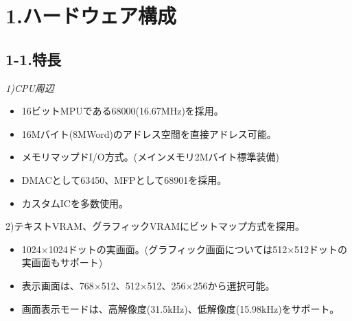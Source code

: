 \documentclass[twoside,a4paper,12pt]{article}
\begin{document}

\newpage

\cfoot{\ \\[-15mm]
- \thepage \ -}

\section*{1.ハードウェア構成}

\subsection*{1-1.特長}

\renewcommand{\labelitemi}{・}
\setlength{\parindent}{20mm}
\setlength{\parskip}{0mm}
\small
\itshape
1)CPU周辺
\begin{itemize}[leftmargin=30mm, itemsep=-1mm, topsep=1mm]
\item
16ビットMPUである68000(16.67MHz)を採用。
\item
16Mバイト(8MWord)のアドレス空間を直接アドレス可能。
\item
メモリマップドI/O方式。(メインメモリ2Mバイト標準装備)
\item
DMACとして63450、MFPとして68901を採用。
\item
カスタムICを多数使用。
\end{itemize}

2)テキストVRAM、グラフィックVRAMにビットマップ方式を探用。

\begin{itemize}[leftmargin=30mm, itemsep=-1mm, topsep=1mm]
\item
1024×1024ドットの実画面。(グラフィック画面については512×512ドットの実画面もサポート)
\item
表示画面は、768×512、512×512、256×256から選択可能。
\item
画面表示モードは、高解像度(31.5kHz)、低解像度(15.98kHz)をサポート。
\end{itemize}
\end{document}
